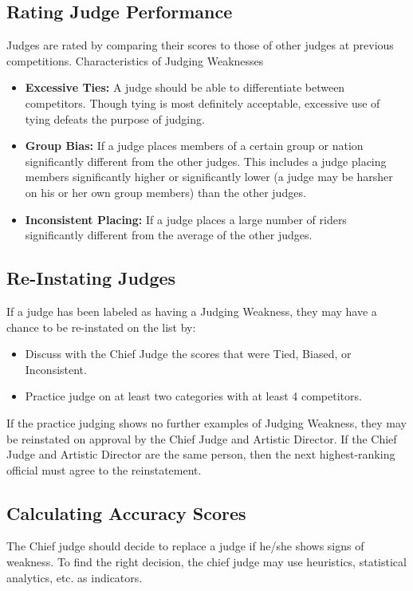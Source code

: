 \subsection{Rating Judge Performance  \label{subsec:freestyle_judging-panel_rating-judge-performance}}
Judges are rated by comparing their scores to those of other judges at previous competitions.
Characteristics of Judging Weaknesses
\begin{itemize}
\item \textbf{Excessive Ties:} A judge should be able to differentiate between competitors.
Though tying is most definitely acceptable, excessive use of tying defeats the purpose of judging.
\item \textbf{Group Bias:} If a judge places members of a certain group or nation significantly different from the other judges.
This includes a judge placing members significantly higher or significantly lower (a judge may be harsher on his or her own group members) than the other judges.
\item \textbf{Inconsistent Placing:} If a judge places a large number of riders significantly different from the average of the other judges.
\end{itemize}

\subsection{Re-Instating Judges}
If a judge has been labeled as having a Judging Weakness, they may have a chance to be re-instated on the list by:
\begin{itemize} 
\item Discuss with the Chief Judge the scores that were Tied, Biased, or Inconsistent.
\item Practice judge on at least two categories with at least 4 competitors.
\end{itemize}
If the practice judging shows no further examples of Judging Weakness, they may be reinstated on approval by the Chief Judge and Artistic Director.
If the Chief Judge and Artistic Director are the same person, then the next highest-ranking official must agree to the reinstatement.

\subsection{Calculating Accuracy Scores \label{subsec:freestyle_judging-panel_calculating-accuracy-scores}}
The Chief judge should decide to replace a judge if he/she shows signs of weakness.
To find the right decision, the chief judge may use heuristics, statistical analytics, etc. as indicators.

